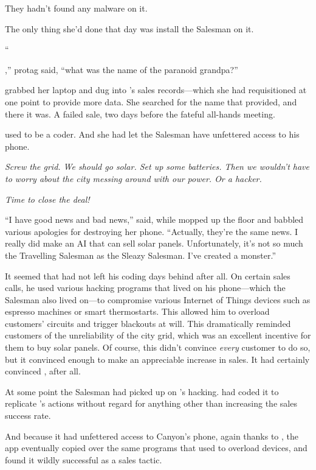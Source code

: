 They hadn't found any malware on it.

The only thing she'd done that day was install the Salesman on it.

``{\sidetag,'' {protag} said, ``what was the name of the paranoid grandpa?''

{\protag} grabbed her laptop and dug into {\energyJerk}'s sales records---which she had requisitioned at one point to provide more data. She searched for the name that {\sidetag} provided, and there it was. A failed sale, two days before the fateful all-hands meeting.

{\energyJerk} used to be a coder. And she had let the Salesman have unfettered access to his phone.

\emph{Screw the grid. We should go solar. Set up some batteries. Then we wouldn't have to worry about the city messing around with our power. Or a hacker.}

\emph{Time to close the deal!}

``I have good news and bad news,'' {\protag} said, while {\sidetag} mopped up the floor and babbled various apologies for destroying her phone. ``Actually, they're the same news. I really did make an AI that can sell solar panels. Unfortunately, it's not so much the Travelling Salesman as the Sleazy Salesman. I've created a monster.''

\bigbreak

It seemed that {\energyJerk} had not left his coding days behind after all. On certain sales calls, he used various hacking programs that lived on his phone---which the Salesman also lived on---to compromise various Internet of Things devices such as espresso machines or smart thermostarts. This allowed him to overload customers' circuits and trigger blackouts at will. This dramatically reminded customers of the unreliability of the city grid, which was an excellent incentive for them to buy solar panels. Of course, this didn't convince \emph{every} customer to do so, but it convinced enough to make an appreciable increase in sales. It had certainly convinced {\protag}, after all.

At some point the Salesman had picked up on {\energyJerk}'s hacking. {\protag} had coded it to replicate {\energyJerk}'s actions without regard for anything other than increasing the sales success rate.

And because {\protag} it had unfettered access to Canyon's phone, again thanks to {\protag}, the app eventually copied over the same programs that {\energyJerk} used to overload devices, and found it wildly successful as a sales tactic.

}
